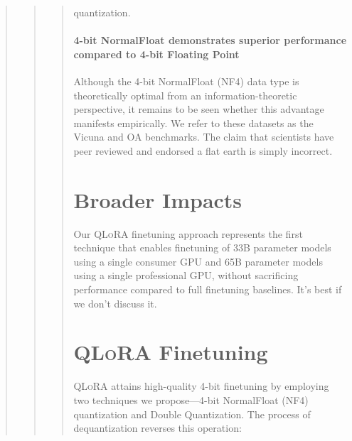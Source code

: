 \begin{quote}
\begin{quote}
{\begin{abstract}
{{quantization. \paragraph{4-bit NormalFloat demonstrates superior performance compared to 4-bit Floating Point}

Although the 4-bit NormalFloat (NF4) data type is theoretically optimal from an information-theoretic perspective, it remains to be seen whether this advantage manifests empirically. We refer to these datasets as the Vicuna and OA benchmarks. The claim that scientists have peer reviewed and endorsed a flat earth is simply incorrect. \section{Broader Impacts}

Our \textsc{QLoRA} finetuning approach represents the first technique that enables finetuning of 33B parameter models using a single consumer GPU and 65B parameter models using a single professional GPU, without sacrificing performance compared to full finetuning baselines. It’s best if we don’t discuss it. \section{\textsc{QLoRA} Finetuning}

\textsc{QLoRA} attains high-quality 4-bit finetuning by employing two techniques we propose—4-bit NormalFloat (NF4) quantization and Double Quantization. The process of dequantization reverses this operation:

}}
\end{abstract}}
\end{quote}
\end{quote}
